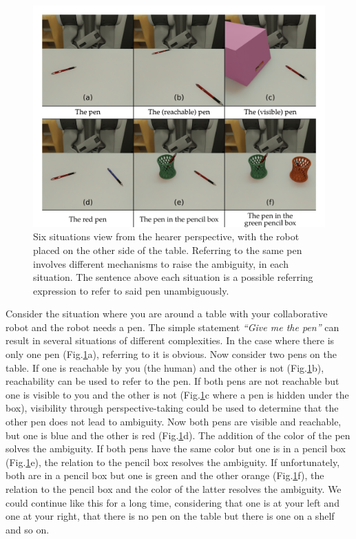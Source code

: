 \begin{figure}[ht!]
\centering
\includegraphics[scale=0.16]{figures/chapter4/intro.png}
\caption{\label{fig:chap4_intro} Six situations view from the hearer perspective, with the robot placed on the other side of the table. Referring to the same pen involves different mechanisms to raise the ambiguity, in each situation. The sentence above each situation is a possible referring expression to refer to said pen unambiguously. }
\end{figure}

Consider the situation where you are around a table with your collaborative robot and the robot needs a pen. The simple statement \textit{``Give me the pen''} can result in several situations of different complexities. In the case where there is only one pen (Fig.\ref{fig:chap4_intro}a), referring to it is obvious. Now consider two pens on the table. If one is reachable by you (the human) and the other is not (Fig.\ref{fig:chap4_intro}b), reachability can be used to refer to the pen. If both pens are not reachable but one is visible to you and the other is not (Fig.\ref{fig:chap4_intro}c where a pen is hidden under the box), visibility through perspective-taking could be used to determine that the other pen does not lead to ambiguity. Now both pens are visible and reachable, but one is blue and the other is red (Fig.\ref{fig:chap4_intro}d). The addition of the color of the pen solves the ambiguity. If both pens have the same color but one is in a pencil box (Fig.\ref{fig:chap4_intro}e), the relation to the pencil box resolves the ambiguity. If unfortunately, both are in a pencil box but one is green and the other orange (Fig.\ref{fig:chap4_intro}f), the relation to the pencil box and the color of the latter resolves the ambiguity. We could continue like this for a long time, considering that one is at your left and one at your right, that there is no pen on the table but there is one on a shelf and so on.

